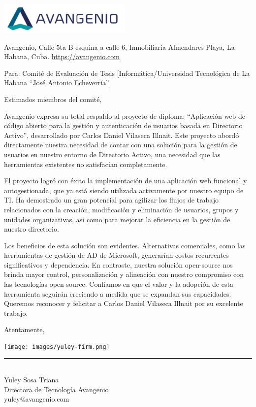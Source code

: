 \begin{minipage}[t]{0.6\textwidth}
    \vspace*{0pt}
    \includegraphics[width=\linewidth]{images/avangenio.png}
\end{minipage}%
\begin{minipage}[t]{0.4\textwidth}
    \vspace*{0pt}
    \raggedleft
    Avangenio,
    Calle 5ta B esquina a calle 6, Inmobiliaria Almendares Playa, La Habana, Cuba.
    \url{https://avangenio.com}
\end{minipage}

Para:    Comité  de  Evaluación  de  Tesis  [Informática/Universidad  Tecnológica  de  La  Habana  ``José  Antonio Echeverría'']

Estimados miembros del comité,

Avangenio expresa su total respaldo al proyecto de diploma: ``Aplicación web de código abierto para la gestión y autenticación de usuarios basada en Directorio Activo'', desarrollado por Carlos Daniel Vilaseca Illnait. Este proyecto abordó directamente nuestra necesidad de contar con una solución para la gestión de usuarios en nuestro entorno de Directorio Activo, una necesidad que las herramientas existentes no satisfacían completamente.

El proyecto logró con éxito la implementación de una aplicación web funcional y autogestionada, que ya está siendo utilizada activamente por nuestro equipo de TI. Ha demostrado un gran potencial para agilizar los flujos de trabajo relacionados con la creación, modificación y eliminación de usuarios, grupos y unidades organizativas, así como para mejorar la eficiencia en la gestión de nuestro directorio.

Los beneficios de esta solución son evidentes. Alternativas comerciales, como las herramientas de gestión de AD de Microsoft, generarían costos recurrentes significativos y dependencia. En contraste, nuestra solución open-source nos brinda mayor control, personalización y alineación con nuestro compromiso con las tecnologías open-source. Confiamos en que el valor y la adopción de esta herramienta seguirán creciendo a medida que se expandan sus capacidades. Queremos reconocer y felicitar a Carlos Daniel Vilaseca Illnait por su excelente trabajo.


Atentamente,
\begingroup

\setlength{\tabcolsep}{10pt}
\renewcommand{\arraystretch}{0.5}
\texttt{[image: images/yuley-firm.png]}\\
\noindent\rule{6cm}{0.4pt}\\
Yuley Sosa Triana\\
Directora de Tecnología Avangenio\\
yuley@avangenio.com

\vspace{3cm}

\endgroup



\restoregeometry
